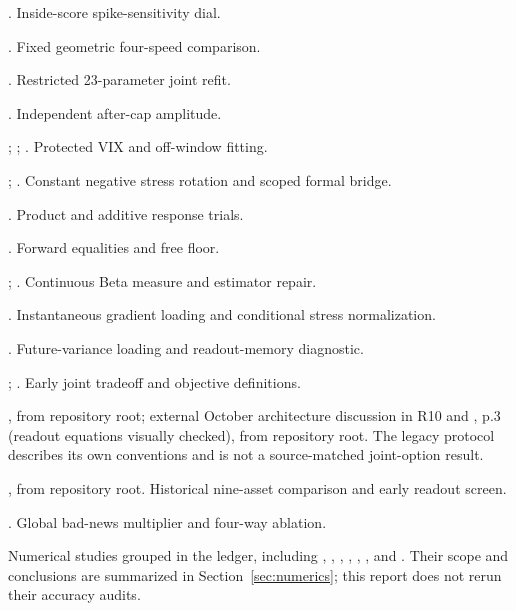 \documentclass[11pt,a4paper]{article}
\begin{document}
\begin{description}[style=nextline,leftmargin=1.5em,labelindent=0pt,itemsep=0pt,parsep=0pt]
\item[R14] . Inside-score spike-sensitivity dial.
\item[R14b] . Fixed geometric four-speed comparison.
\item[R15] . Restricted 23-parameter joint refit.
\item[R16] . Independent after-cap amplitude.
\item[R16b] ; ; . Protected VIX and off-window fitting.
\item[R17] ; . Constant negative stress rotation and scoped formal bridge.
\item[R18] . Product and additive response trials.
\item[R19] . Forward equalities and free floor.
\item[R20] ; . Continuous Beta measure and estimator repair.
\item[R21] . Instantaneous gradient loading and conditional stress normalization.
\item[R22] . Future-variance loading and readout-memory diagnostic.
\item[R23] ; . Early joint tradeoff and objective definitions.
\item[R24] , from repository root; external October architecture discussion in R10 and , p.3 (readout equations visually checked), from repository root. The legacy protocol describes its own conventions and is not a source-matched joint-option result.
\item[R25] , from repository root. Historical nine-asset comparison and early readout screen.
\item[R26] . Global bad-news multiplier and four-way ablation.
\item[R27] Numerical studies grouped in the ledger, including , , , , , ,  and . Their scope and conclusions are summarized in Section~\ref{sec:numerics}; this report does not rerun their accuracy audits.

\end{description}
\end{document}
